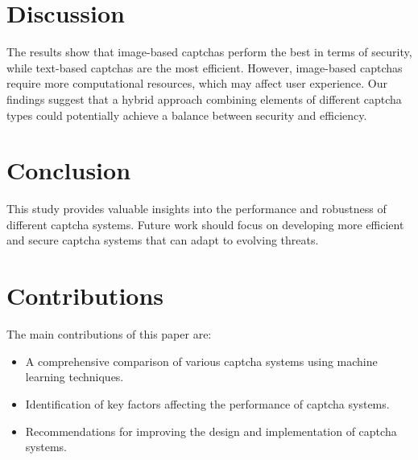 \documentclass{article}
\begin{document}
\section{Discussion}
The results show that image-based captchas perform the best in terms of security, while text-based captchas are the most efficient. However, image-based captchas require more computational resources, which may affect user experience. Our findings suggest that a hybrid approach combining elements of different captcha types could potentially achieve a balance between security and efficiency.

\section{Conclusion}
This study provides valuable insights into the performance and robustness of different captcha systems. Future work should focus on developing more efficient and secure captcha systems that can adapt to evolving threats.

\section{Contributions}
The main contributions of this paper are:
\begin{itemize}
    \item A comprehensive comparison of various captcha systems using machine learning techniques.
    \item Identification of key factors affecting the performance of captcha systems.
    \item Recommendations for improving the design and implementation of captcha systems.
\end{itemize}



\end{document}

